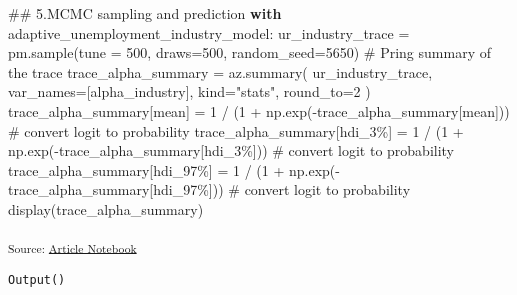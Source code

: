 \documentclass[
]{agujournal2019}
\newenvironment{Shaded}{\begin{snugshade}}{\end{snugshade}}
\newcommand{\CommentTok}[1]{\textcolor[rgb]{0.37,0.37,0.37}{#1}}
\newcommand{\ControlFlowTok}[1]{\textcolor[rgb]{0.00,0.23,0.31}{\textbf{#1}}}
\newcommand{\DecValTok}[1]{\textcolor[rgb]{0.68,0.00,0.00}{#1}}
\newcommand{\NormalTok}[1]{\textcolor[rgb]{0.00,0.23,0.31}{#1}}
\newcommand{\OperatorTok}[1]{\textcolor[rgb]{0.37,0.37,0.37}{#1}}
\newcommand{\StringTok}[1]{\textcolor[rgb]{0.13,0.47,0.30}{#1}}
\begin{document}
\begin{Shaded}
\begin{Highlighting}[]
\CommentTok{\#\# 5.MCMC sampling and prediction}
\ControlFlowTok{with}\NormalTok{ adaptive\_unemployment\_industry\_model:}
\NormalTok{    ur\_industry\_trace }\OperatorTok{=}\NormalTok{ pm.sample(tune }\OperatorTok{=} \DecValTok{500}\NormalTok{, draws}\OperatorTok{=}\DecValTok{500}\NormalTok{, random\_seed}\OperatorTok{=}\DecValTok{5650}\NormalTok{)}
\CommentTok{\# Pring summary of the trace}
\NormalTok{trace\_alpha\_summary }\OperatorTok{=}\NormalTok{ az.summary(}
\NormalTok{    ur\_industry\_trace,}
\NormalTok{    var\_names}\OperatorTok{=}\NormalTok{[}\StringTok{\textquotesingle{}alpha\_industry\textquotesingle{}}\NormalTok{],}
\NormalTok{    kind}\OperatorTok{=}\StringTok{"stats"}\NormalTok{, }
\NormalTok{    round\_to}\OperatorTok{=}\DecValTok{2}
\NormalTok{)}
\NormalTok{trace\_alpha\_summary[}\StringTok{\textquotesingle{}mean\textquotesingle{}}\NormalTok{] }\OperatorTok{=} \DecValTok{1} \OperatorTok{/}\NormalTok{ (}\DecValTok{1} \OperatorTok{+}\NormalTok{ np.exp(}\OperatorTok{{-}}\NormalTok{trace\_alpha\_summary[}\StringTok{\textquotesingle{}mean\textquotesingle{}}\NormalTok{])) }\CommentTok{\# convert logit to probability}
\NormalTok{trace\_alpha\_summary[}\StringTok{\textquotesingle{}hdi\_3\%\textquotesingle{}}\NormalTok{] }\OperatorTok{=} \DecValTok{1} \OperatorTok{/}\NormalTok{ (}\DecValTok{1} \OperatorTok{+}\NormalTok{ np.exp(}\OperatorTok{{-}}\NormalTok{trace\_alpha\_summary[}\StringTok{\textquotesingle{}hdi\_3\%\textquotesingle{}}\NormalTok{])) }\CommentTok{\# convert logit to probability}
\NormalTok{trace\_alpha\_summary[}\StringTok{\textquotesingle{}hdi\_97\%\textquotesingle{}}\NormalTok{] }\OperatorTok{=} \DecValTok{1} \OperatorTok{/}\NormalTok{ (}\DecValTok{1} \OperatorTok{+}\NormalTok{ np.exp(}\OperatorTok{{-}}\NormalTok{trace\_alpha\_summary[}\StringTok{\textquotesingle{}hdi\_97\%\textquotesingle{}}\NormalTok{])) }\CommentTok{\# convert logit to probability}
\NormalTok{display(trace\_alpha\_summary)}
\end{Highlighting}
\end{Shaded}

\textsubscript{Source:
\href{https://mw1296.github.io/dsan5650_social_causal_inference/index.qmd.html}{Article
Notebook}}

\begin{verbatim}
Output()
\end{verbatim}

\begin{verbatim}
\end{verbatim}
\end{document}
